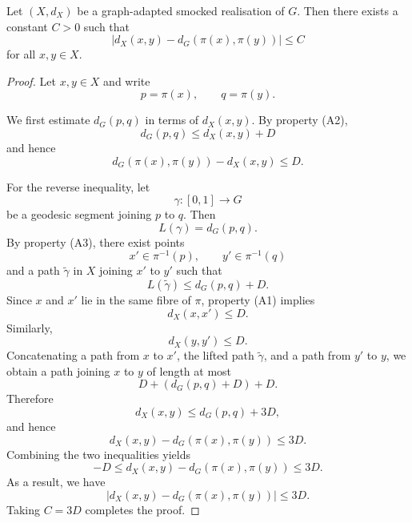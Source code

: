 \documentclass[10pt,a4paper]{amsart}
\begin{document}
\begin{lemma}
\label{prop:additive}
Let $(X,d_X)$ be a graph-adapted smocked realisation of $G$.  Then there exists a constant $C>0$ such that
\[
\bigl|
d_X(x,y)-d_G(\pi(x),\pi(y))
\bigr|
\le C
\]
for all $x,y\in X$.
\end{lemma}

\begin{proof}
Let $x,y\in X$ and write
\[
p=\pi(x),\qquad q=\pi(y).
\]

\noindent
We first estimate $d_G(p,q)$ in terms of $d_X(x,y)$.  By property {\rm(A2)},
\[
d_G(p,q)\le d_X(x,y)+D
\]
and hence
\[
d_G(\pi(x),\pi(y))-d_X(x,y)\le D.
\]

\noindent
For the reverse inequality, let
\[
\gamma:[0,1]\to G
\]
be a geodesic segment joining $p$ to $q$. Then
\[
L(\gamma)=d_G(p,q).
\]
By property {\rm(A3)}, there exist points
\[
x'\in \pi^{-1}(p), \qquad
y'\in \pi^{-1}(q)
\]
and a path $\widetilde{\gamma}$ in $X$ joining $x'$ to $y'$ such that
\[
L(\widetilde{\gamma})
\le d_G(p,q)+D.
\]
Since $x$ and $x'$ lie in the same fibre of $\pi$, property {\rm(A1)}
implies
\[
d_X(x,x')\le D.
\]
Similarly,
\[
d_X(y,y')\le D.
\]
Concatenating a path from $x$ to $x'$, the lifted path
$\widetilde{\gamma}$, and a path from $y'$ to $y$, we obtain a path
joining $x$ to $y$ of length at most
\[
D+(d_G(p,q)+D)+D.
\]
Therefore
\[
d_X(x,y)\le d_G(p,q)+3D,
\]
and hence
\[
d_X(x,y)-d_G(\pi(x),\pi(y))
\le 3D.
\]
Combining the two inequalities yields
\[
-D
\le
d_X(x,y)-d_G(\pi(x),\pi(y))
\le
3D.
\]
As a result, we have
\[
\bigl|d_X(x,y)-d_G(\pi(x),\pi(y))\bigr|
\le 3D.
\]
Taking $C=3D$ completes the proof.
\end{proof}
\end{document}
